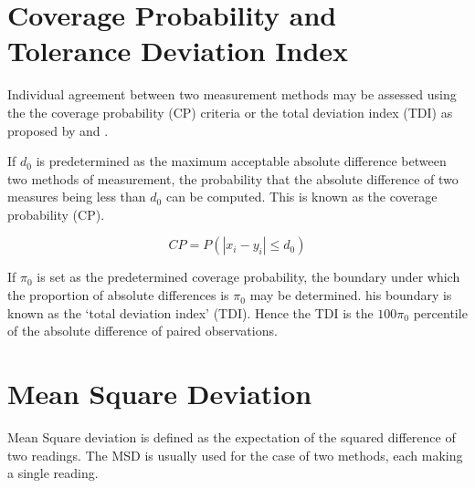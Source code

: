 \section{Coverage Probability and Tolerance Deviation Index}

Individual agreement between two measurement methods may be
assessed using the the coverage probability (CP) criteria or the
total deviation index (TDI) as proposed by \citet{lin2000} and
\citet{lin2002}.

If $d_{0}$ is predetermined as the maximum acceptable absolute
difference between two methods of measurement, the probability
that the absolute difference of two measures being less than
$d_{0}$ can be computed. This is known as the coverage probability
(CP).

\begin{equation}
CP = P(|x_{i} - y_{i}| \leq d_{0})
\end{equation}

If $\pi_{0}$ is set as the predetermined coverage probability, the
boundary under which the proportion of absolute differences is
$\pi_{0}$ may be determined. his boundary is known as the `total
deviation index' (TDI). Hence the TDI is the $100\pi_{0}$
percentile of the absolute difference of paired observations.


\section{Mean Square Deviation}
Mean Square deviation is defined as the expectation of the squared difference of two readings.
The MSD is usually used for the case of two methods, each making a single reading.





